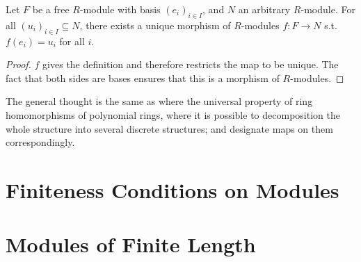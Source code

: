 \documentclass{article}
\begin{document}
\begin{theorem}
    Let $F$ be a free $R$-module with basis $(e_i)_{i\in I}$, and $N$ an arbitrary $R$-module. For all $(u_i)_{i\in I} \subseteq N$, there exists a unique morphism of $R$-modules $f: F\to N$ s.t. $f(e_i) = u_i$ for all $i$.
\end{theorem}

\begin{proof}
    $f$ gives the definition and therefore restricts the map to be unique. The fact that both sides are bases ensures that this is a morphism of $R$-modules. 
\end{proof}

\begin{remark}
    The general thought is the same as where the universal property of ring homomorphisms of polynomial rings, where it is possible to decomposition the whole structure into several discrete structures; and designate maps on them correspondingly.
\end{remark}

\section{Finiteness Conditions on Modules}

\section{Modules of Finite Length}
\end{document}
